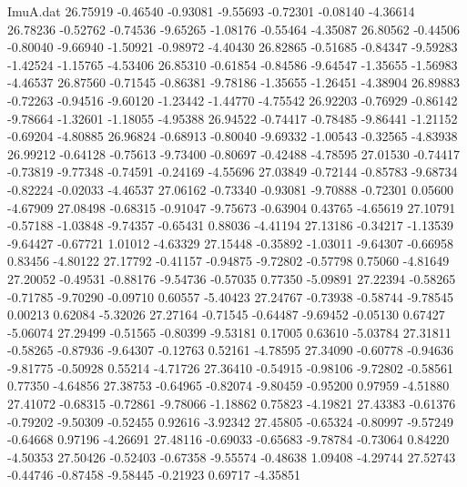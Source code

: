 \begin{filecontents}{ImuA.dat}
  26.75919   -0.46540   -0.93081   -9.55693   -0.72301   -0.08140   -4.36614
  26.78236   -0.52762   -0.74536   -9.65265   -1.08176   -0.55464   -4.35087
  26.80562   -0.44506   -0.80040   -9.66940   -1.50921   -0.98972   -4.40430
  26.82865   -0.51685   -0.84347   -9.59283   -1.42524   -1.15765   -4.53406
  26.85310   -0.61854   -0.84586   -9.64547   -1.35655   -1.56983   -4.46537
  26.87560   -0.71545   -0.86381   -9.78186   -1.35655   -1.26451   -4.38904
  26.89883   -0.72263   -0.94516   -9.60120   -1.23442   -1.44770   -4.75542
  26.92203   -0.76929   -0.86142   -9.78664   -1.32601   -1.18055   -4.95388
  26.94522   -0.74417   -0.78485   -9.86441   -1.21152   -0.69204   -4.80885
  26.96824   -0.68913   -0.80040   -9.69332   -1.00543   -0.32565   -4.83938
  26.99212   -0.64128   -0.75613   -9.73400   -0.80697   -0.42488   -4.78595
  27.01530   -0.74417   -0.73819   -9.77348   -0.74591   -0.24169   -4.55696
  27.03849   -0.72144   -0.85783   -9.68734   -0.82224   -0.02033   -4.46537
  27.06162   -0.73340   -0.93081   -9.70888   -0.72301    0.05600   -4.67909
  27.08498   -0.68315   -0.91047   -9.75673   -0.63904    0.43765   -4.65619
  27.10791   -0.57188   -1.03848   -9.74357   -0.65431    0.88036   -4.41194
  27.13186   -0.34217   -1.13539   -9.64427   -0.67721    1.01012   -4.63329
  27.15448   -0.35892   -1.03011   -9.64307   -0.66958    0.83456   -4.80122
  27.17792   -0.41157   -0.94875   -9.72802   -0.57798    0.75060   -4.81649
  27.20052   -0.49531   -0.88176   -9.54736   -0.57035    0.77350   -5.09891
  27.22394   -0.58265   -0.71785   -9.70290   -0.09710    0.60557   -5.40423
  27.24767   -0.73938   -0.58744   -9.78545    0.00213    0.62084   -5.32026
  27.27164   -0.71545   -0.64487   -9.69452   -0.05130    0.67427   -5.06074
  27.29499   -0.51565   -0.80399   -9.53181    0.17005    0.63610   -5.03784
  27.31811   -0.58265   -0.87936   -9.64307   -0.12763    0.52161   -4.78595
  27.34090   -0.60778   -0.94636   -9.81775   -0.50928    0.55214   -4.71726
  27.36410   -0.54915   -0.98106   -9.72802   -0.58561    0.77350   -4.64856
  27.38753   -0.64965   -0.82074   -9.80459   -0.95200    0.97959   -4.51880
  27.41072   -0.68315   -0.72861   -9.78066   -1.18862    0.75823   -4.19821
  27.43383   -0.61376   -0.79202   -9.50309   -0.52455    0.92616   -3.92342
  27.45805   -0.65324   -0.80997   -9.57249   -0.64668    0.97196   -4.26691
  27.48116   -0.69033   -0.65683   -9.78784   -0.73064    0.84220   -4.50353
  27.50426   -0.52403   -0.67358   -9.55574   -0.48638    1.09408   -4.29744
  27.52743   -0.44746   -0.87458   -9.58445   -0.21923    0.69717   -4.35851

\end{filecontents}

